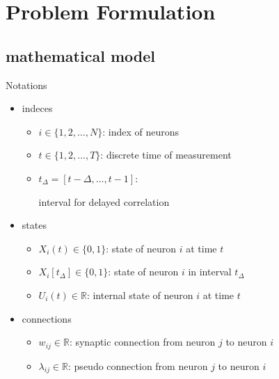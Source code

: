 \documentclass[fleqn,aspectratio=1610]{beamer}
\begin{document}
\section{Problem Formulation}
\label{sec:org9de027e}
\subsection{mathematical model}
\label{sec:orge11b01d}
\begin{frame}[label={sec:orge41df7f}]{Notations}
\begin{itemize}
\item indeces
\begin{itemize}
\item \(i\in\{1,2,\dotsc,N\}\):
index of neurons
\item \(t\in\{1,2,\dotsc,T\}\):
discrete time of measurement
\item \(t_{\Delta}=[t-\Delta,\dotsc,t-1]\):

interval for delayed correlation
\end{itemize}
\item states
\begin{itemize}
\item \(X_{i}(t)\in\{0,1\}\):
state of neuron \(i\) at time \(t\)
\item \(X_{i}[t_{\Delta}]\in\{0,1\}\):
state of neuron \(i\) in interval \(t_{\Delta}\)
\item \(U_{i}(t)\in\mathbb{R}\):
internal state of neuron \(i\) at time \(t\)
\end{itemize}
\item connections
\begin{itemize}
\item \(w_{ij}\in\mathbb{R}\):
synaptic connection from neuron \(j\) to neuron \(i\)
\item \(\lambda_{ij}\in\mathbb{R}\):
pseudo connection from neuron \(j\) to neuron \(i\)
\end{itemize}
\end{itemize}
\end{frame}
\end{document}
